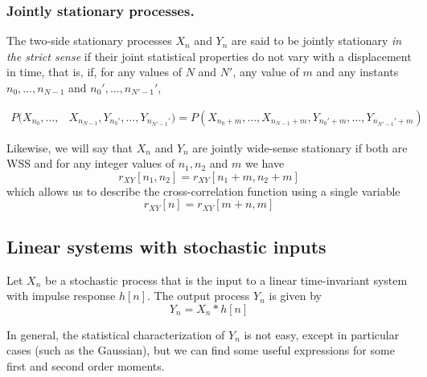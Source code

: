 \subsubsection{Jointly stationary processes.}

The two-side stationary processes $X_n$ and $Y_n$ are said to be jointly stationary \textsl{in the strict sense} if their joint statistical 
properties do not vary with a displacement in time, that is, if, for any values of $N$ and $N'$, any value of $m$ and any instants $n_0,\ldots,n_{N-1}$ and $n_0',\ldots,n_{N'-1}'$,

\begin{align}
P(X_{n_0}, \ldots, & X_{n_{N-1}}, Y_{n_0'}, \ldots, Y_{n_{N'-1}'}) 
           =  P(X_{n_0 + m}, \ldots, X_{n_{N-1} + m}, Y_{n_0' + m}, \ldots, Y_{n_{N'-1}' + m})
\end{align}

Likewise, we will say that $X_n$ and $Y_n$ are jointly wide-sense stationary if both are WSS and for any integer values of $n_1, n_2$ and $m$ we have
\begin{equation}
r_{XY}[n_1,n_2] = r_{XY}[n_1 + m, n_2 + m]
\end{equation}
which allows us to describe the cross-correlation function using a single variable
\begin{equation}
r_{XY}[n] = r_{XY}[m + n, m]
\end{equation}


\subsection{Linear systems with stochastic inputs}
\label{sec:SistemasEntradasStoc}

Let $X_n$ be a stochastic process that is the input to a linear time-invariant system with impulse response $h[n]$. The output process $Y_n$ is given by
\begin{equation}
Y_n = X_n \ast h[n]
\end{equation}

In general, the statistical characterization of $Y_n$ is not easy, except in particular cases (such as the Gaussian), but we can find some useful expressions for some first and second order moments.

